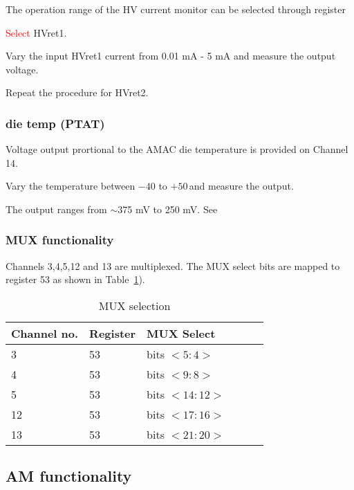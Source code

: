 \documentclass[11pt]{article}   			%
\newcommand\todo[1]{\textcolor{red}{#1}}
\begin{document}
\begin{compactitem}
    \item{The operation range of the HV current monitor can be selected through register}
    \item{\todo{Select} HVret1.}
    \item{Vary the input HVret1 current from 0.01 mA - 5 mA and measure the output voltage.}
    \item{Repeat the procedure for HVret2.}
\end{compactitem}

\subsubsection{die temp (PTAT)}
\begin{compactitem}
    \item{Voltage output prortional to the AMAC die temperature is provided on Channel 14.}
    \item{Vary the temperature between $-40$ to $+50$\,\celsius and measure the output.}
    \item{The output ranges from $\sim$375 mV to 250 mV. See \cite{diodetemp}}
\end{compactitem}

\subsubsection{MUX functionality}
Channels 3,4,5,12 and 13 are multiplexed. The MUX select bits are mapped to register 53 as shown in Table~\ref{tab:mux}).
\begin{table}[h]
\begin{center}
\begin{tabular}{|l|l|l|l|l|l|}
\hline
{\bf Channel no.} & {\bf Register} & {\bf MUX Select}\\
\hline
3 & 53 & bits $<5:4>$\\
\hline
4 & 53 & bits $<9:8>$\\
\hline
5 & 53 & bits $<14:12>$\\
\hline
12 & 53 & bits $<17:16>$\\
\hline
13 & 53 & bits $<21:20>$\\
\hline
\end{tabular}
\caption{MUX selection}
\label{tab:mux}
\end{center}
\end{table}

\subsection{AM functionality}
\end{document}
